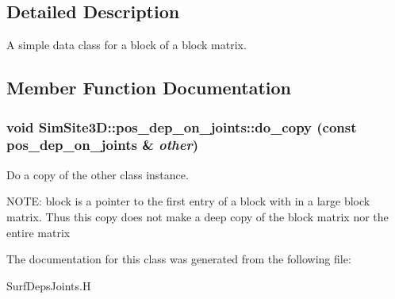 \subsection{Detailed Description}
A simple data class for a block of a block matrix. 



\subsection{Member Function Documentation}
\subsubsection{\setlength{\rightskip}{0pt plus 5cm}void SimSite3D::pos\_\-dep\_\-on\_\-joints::do\_\-copy (const \bf{pos\_\-dep\_\-on\_\-joints} \& {\em other})\hspace{0.3cm}{\tt  [inline, private]}}\label{classSimSite3D_1_1pos__dep__on__joints_ae39e679f64999ac2afd3896e7bcf2de}


Do a copy of the other class instance. 

NOTE: block is a pointer to the first entry of a block with in a large block matrix. Thus this copy does not make a deep copy of the block matrix nor the entire matrix 

The documentation for this class was generated from the following file:\begin{CompactItemize}
\item 
Surf\-Deps\-Joints.H\end{CompactItemize}
